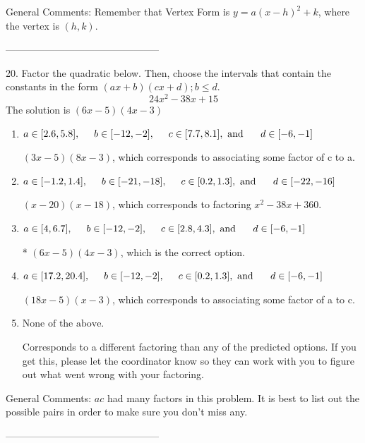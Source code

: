 \documentclass{extbook}[14pt]
\begin{document}
General Comments: Remember that Vertex Form is $y = a(x-h)^2+k$, where the vertex is $(h, k)$.

-----------------------------------------------

20. Factor the quadratic below. Then, choose the intervals that contain the constants in the form $(ax+b)(cx+d); b \leq d.$
\[ 24x^{2} -38 x + 15 \] 
The solution is $ (6x -5)(4x -3) $ 

\begin{enumerate}[label=\Alph*.] 
\item $ a \in [2.6, 5.8], \hspace*{5mm} b \in [-12, -2], \hspace*{5mm} c \in [7.7, 8.1], \text{ and } \hspace*{5mm} d \in [-6, -1] $ 

  $(3x -5)(8x -3)$, which corresponds to associating some factor of c to a. 
\item $ a \in [-1.2, 1.4], \hspace*{5mm} b \in [-21, -18], \hspace*{5mm} c \in [0.2, 1.3], \text{ and } \hspace*{5mm} d \in [-22, -16] $ 

  $(x -20)(x -18)$, which corresponds to factoring $x^{2} -38 x + 360$. 
\item $ a \in [4, 6.7], \hspace*{5mm} b \in [-12, -2], \hspace*{5mm} c \in [2.8, 4.3], \text{ and } \hspace*{5mm} d \in [-6, -1] $ 

 * $(6x -5)(4x -3)$, which is the correct option. 
\item $ a \in [17.2, 20.4], \hspace*{5mm} b \in [-12, -2], \hspace*{5mm} c \in [0.2, 1.3], \text{ and } \hspace*{5mm} d \in [-6, -1] $ 

  $(18x -5)(x -3)$, which corresponds to associating some factor of a to c. 
\item $ \text{None of the above.} $ 

  Corresponds to a different factoring than any of the predicted options. If you get this, please let the coordinator know so they can work with you to figure out what went wrong with your factoring. 
\end{enumerate} 
 
General Comments: $ac$ had many factors in this problem. It is best to list out the possible pairs in order to make sure you don't miss any.

-----------------------------------------------
\end{document}
